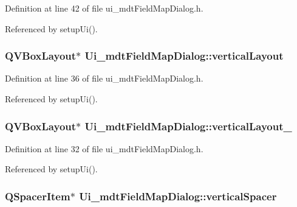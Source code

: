 Definition at line 42 of file ui\-\_\-mdt\-Field\-Map\-Dialog.\-h.



Referenced by setup\-Ui().

\hypertarget{class_ui__mdt_field_map_dialog_a126ba01f2e1767c734682486db335960}{
\subsubsection[{vertical\-Layout}]{\setlength{\rightskip}{0pt plus 5cm}Q\-V\-Box\-Layout$\ast$ Ui\-\_\-mdt\-Field\-Map\-Dialog\-::vertical\-Layout}}\label{class_ui__mdt_field_map_dialog_a126ba01f2e1767c734682486db335960}


Definition at line 36 of file ui\-\_\-mdt\-Field\-Map\-Dialog.\-h.



Referenced by setup\-Ui().

\hypertarget{class_ui__mdt_field_map_dialog_ab02cee4966f301ecab7203d21905f62a}{
\subsubsection[{vertical\-Layout\-\_\-2}]{\setlength{\rightskip}{0pt plus 5cm}Q\-V\-Box\-Layout$\ast$ Ui\-\_\-mdt\-Field\-Map\-Dialog\-::vertical\-Layout\-\_}}\label{class_ui__mdt_field_map_dialog_ab02cee4966f301ecab7203d21905f62a}


Definition at line 32 of file ui\-\_\-mdt\-Field\-Map\-Dialog.\-h.



Referenced by setup\-Ui().

\hypertarget{class_ui__mdt_field_map_dialog_a0e77e0b333f2ba3b75e1661b44c44b58}{
\subsubsection[{vertical\-Spacer}]{\setlength{\rightskip}{0pt plus 5cm}Q\-Spacer\-Item$\ast$ Ui\-\_\-mdt\-Field\-Map\-Dialog\-::vertical\-Spacer}}\label{class_ui__mdt_field_map_dialog_a0e77e0b333f2ba3b75e1661b44c44b58}


